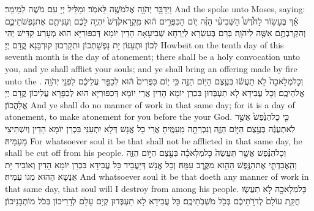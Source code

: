 {וַיְדַבֵּ֥ר יְהֹוָ֖ה אֶל\maqqaf מֹשֶׁ֥ה לֵּאמֹֽר׃}
{וּמַלֵּיל יְיָ עִם מֹשֶׁה לְמֵימַר׃}
{And the \lord\space spoke unto Moses, saying:}{}
{אַ֡ךְ בֶּעָשׂ֣וֹר לַחֹ֩דֶשׁ֩ הַשְּׁבִיעִ֨י הַזֶּ֜ה י֧וֹם הַכִּפֻּרִ֣ים ה֗וּא מִֽקְרָא\maqqaf קֹ֙דֶשׁ֙ יִהְיֶ֣ה לָכֶ֔ם וְעִנִּיתֶ֖ם אֶת\maqqaf נַפְשֹׁתֵיכֶ֑ם וְהִקְרַבְתֶּ֥ם אִשֶּׁ֖ה לַיהֹוָֽה׃}
{בְּרַם בְּעַשְׂרָא לְיַרְחָא שְׁבִיעָאָה הָדֵין יוֹמָא דְּכִפּוּרַיָּא הוּא מְעָרַע קַדִּישׁ יְהֵי לְכוֹן וּתְעַנּוֹן יָת נַפְשָׁתְכוֹן וּתְקָרְבוּן קוּרְבָּנָא קֳדָם יְיָ׃}
{Howbeit on the tenth day of this seventh month is the day of atonement; there shall be a holy convocation unto you, and ye shall afflict your souls; and ye shall bring an offering made by fire unto the \lord.}{}
{וְכׇל\maqqaf מְלָאכָה֙ לֹ֣א תַעֲשׂ֔וּ בְּעֶ֖צֶם הַיּ֣וֹם הַזֶּ֑ה כִּ֣י י֤וֹם כִּפֻּרִים֙ ה֔וּא לְכַפֵּ֣ר עֲלֵיכֶ֔ם לִפְנֵ֖י יְהֹוָ֥ה אֱלֹהֵיכֶֽם׃}
{וְכָל עֲבִידָא לָא תַעְבְּדוּן בִּכְרַן יוֹמָא הָדֵין אֲרֵי יוֹמָא דְּכִפּוּרַיָּא הוּא לְכַפָּרָא עֲלֵיכוֹן קֳדָם יְיָ אֱלָהֲכוֹן׃}
{And ye shall do no manner of work in that same day; for it is a day of atonement, to make atonement for you before the \lord\space your God.}{}
{כִּ֤י כׇל\maqqaf הַנֶּ֙פֶשׁ֙ אֲשֶׁ֣ר לֹֽא\maqqaf תְעֻנֶּ֔ה בְּעֶ֖צֶם הַיּ֣וֹם הַזֶּ֑ה וְנִכְרְתָ֖ה מֵֽעַמֶּֽיהָ׃}
{אֲרֵי כָל אֱנָשׁ דְּלָא יִתְעַנֵּי בִּכְרַן יוֹמָא הָדֵין וְיִשְׁתֵּיצֵי מֵעַמֵּיהּ׃}
{For whatsoever soul it be that shall not be afflicted in that same day, he shall be cut off from his people.}{}
{וְכׇל\maqqaf הַנֶּ֗פֶשׁ אֲשֶׁ֤ר תַּעֲשֶׂה֙ כׇּל\maqqaf מְלָאכָ֔ה בְּעֶ֖צֶם הַיּ֣וֹם הַזֶּ֑ה וְהַֽאֲבַדְתִּ֛י אֶת\maqqaf הַנֶּ֥פֶשׁ הַהִ֖וא מִקֶּ֥רֶב עַמָּֽהּ׃}
{וְכָל אֱנָשׁ דְּיַעֲבֵיד כָּל עֲבִידָא בִּכְרַן יוֹמָא הָדֵין וְאוֹבֵיד יָת אֲנָשָׁא הַהוּא מִגּוֹ עַמֵּיהּ׃}
{And whatsoever soul it be that doeth any manner of work in that same day, that soul will I destroy from among his people.}{}
{כׇּל\maqqaf מְלָאכָ֖ה לֹ֣א תַעֲשׂ֑וּ חֻקַּ֤ת עוֹלָם֙ לְדֹרֹ֣תֵיכֶ֔ם בְּכֹ֖ל מֹשְׁבֹֽתֵיכֶֽם׃}
{כָּל עֲבִידָא לָא תַעְבְּדוּן קְיָם עָלַם לְדָרֵיכוֹן בְּכֹל מוֹתְבָנֵיכוֹן׃}
